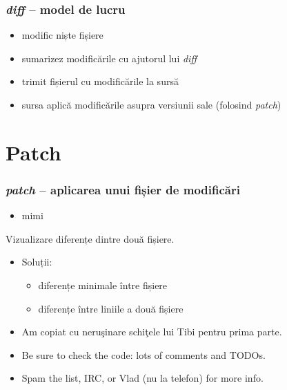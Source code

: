 \documentclass{beamer}
\begin{document}
\begin{frame}
  \frametitle{\textit{diff} – model de lucru}
  \begin{itemize}[<+->]
  \item modific niște fișiere
  \item sumarizez modificările cu ajutorul lui \textit{diff}
  \item trimit fișierul cu modificările la sursă
  \item sursa aplică modificările asupra versiunii sale (folosind \textit{patch})
  \end{itemize}
\end{frame}


\section{Patch}
\frame{\tableofcontents[currentsection]}
\begin{frame}
  \frametitle{\textit{patch} – aplicarea unui fișier de modificări}
  \begin{itemize}
  \item mimi
  \end{itemize}
\end{frame}

\begin{frame}{Vizualizare diferențe dintre două fișiere.}
\begin{itemize} %
\item Soluții:
  \begin{itemize}
  \item diferențe minimale între fișiere
  \item diferențe între liniile a două fișiere
  \end{itemize}
\item Am copiat cu neruşinare schiţele lui Tibi pentru prima parte.
\item Be sure to check the code: lots of comments and TODOs.
\item Spam the list, IRC, or Vlad (nu la telefon) for more info.
\end{itemize}
\end{frame}
\end{document}
